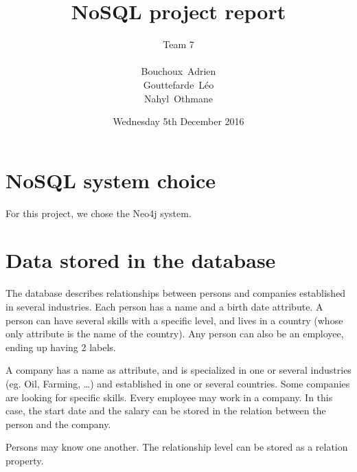 \documentclass[a4paper, 11pt, titlepage]{article}
\title {{ {\huge NoSQL project report }} }
\author{\Large Team 7 \\
\\
    {\sc Bouchoux}~Adrien\\
    {\sc Gouttefarde}~Léo\\
    {\sc Nahyl}~Othmane
}
\date{Wednesday 5th December 2016}
\begin{document}
\pagestyle{fancy}
\maketitle

\setcounter{tocdepth}{2}

\tableofcontents
\newpage



\section {NoSQL system choice}

For this project, we chose the Neo4j system.


\section {Data stored in the database}


The database describes relationships between persons and companies established in several industries. Each person has a name and a birth date attribute. A person can have several skills with a specific level, and lives in a country (whose only attribute is the name of the country). Any person can also be an employee, ending up having 2 labels.

A company has a name as attribute, and is specialized in one or several industries (eg. Oil, Farming, …) and established in one or several countries.
Some companies are looking for specific skills. Every employee may work in a company. In this case, the start date and the salary can be stored in the relation between the person and the company.

Persons may know one another. The relationship level can be stored as a relation property.
\end{document}
